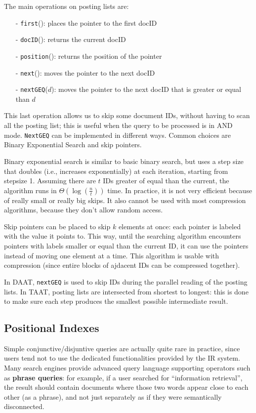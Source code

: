 The main operations on posting lists are:
\begin{itemize}[itemsep=0pt]
    \item[-] \texttt{first}(): places the pointer to the first docID
    \item[-] \texttt{docID}(): returns the current docID
    \item[-] \texttt{position}(): returns the position of the pointer
    \item[-] \texttt{next}(): moves the pointer to the next docID
    \item[-] \texttt{nextGEQ}($d$): moves the pointer to the next docID that is greater or equal than $d$
\end{itemize}
This last operation allows us to skip some document IDs, without having to scan all the posting list; this is useful when the query to be processed is in AND mode. \texttt{NextGEQ} can be implemented in different ways. Common choices are Binary Exponential Search and skip pointers.

Binary exponential search is similar to basic binary search, but uses a step size that doubles (i.e., increases exponentially) at each iteration, starting from stepsize 1. Assuming there are $t$ IDs greater of equal than the current, the algorithm runs in $\Theta (\log(\frac{n}{t}))$ time. In practice, it is not very efficient because of really small or really big skips. It also cannot be used with most compression algorithms, because they don't allow random access.

Skip pointers can be placed to skip $k$ elements at once: each pointer is labeled with the value it points to. This way, until the searching algorithm encounters pointers with labels smaller or equal than the current ID, it can use the pointers instead of moving one element at a time. This algorithm is usable with compression (since entire blocks of ajdacent IDs can be compressed together).

In DAAT, \texttt{nextGEQ} is used to skip IDs during the parallel reading of the posting lists. In TAAT, posting lists are intersected from shortest to longest: this is done to make sure each step produces the smallest possible intermediate result.

\subsection{Positional Indexes}

Simple conjunctive/disjuntive queries are actually quite rare in practice, since users tend not to use the dedicated functionalities provided by the IR system. Many search engines provide advanced query language supporting operators such as \textbf{phrase queries}: for example, if a user searched for ``information retrieval'', the result should contain documents where those two words appear close to each other (as a phrase), and not just separately as if they were semantically disconnected.

